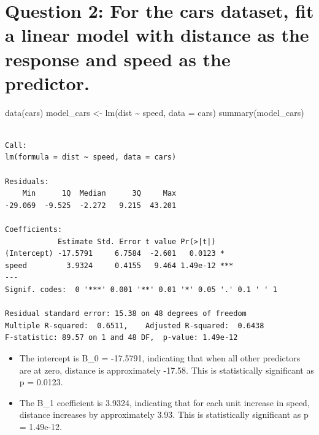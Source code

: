 \documentclass[
  letterpaper,
  DIV=11,
  numbers=noendperiod]{scrartcl}
\newenvironment{Shaded}{\begin{snugshade}}{\end{snugshade}}
\newcommand{\AttributeTok}[1]{\textcolor[rgb]{0.40,0.45,0.13}{#1}}
\newcommand{\FunctionTok}[1]{\textcolor[rgb]{0.28,0.35,0.67}{#1}}
\newcommand{\NormalTok}[1]{\textcolor[rgb]{0.00,0.23,0.31}{#1}}
\newcommand{\OtherTok}[1]{\textcolor[rgb]{0.00,0.23,0.31}{#1}}
\newcommand{\SpecialCharTok}[1]{\textcolor[rgb]{0.37,0.37,0.37}{#1}}
\begin{document}
\hypertarget{question-2-for-the-cars-dataset-fit-a-linear-model-with-distance-as-the-response-and-speed-as-the-predictor.}{%
\section{Question 2: For the cars dataset, fit a linear model with
distance as the response and speed as the
predictor.}\label{question-2-for-the-cars-dataset-fit-a-linear-model-with-distance-as-the-response-and-speed-as-the-predictor.}}

\begin{Shaded}
\begin{Highlighting}[]
\FunctionTok{data}\NormalTok{(cars)}
\NormalTok{model\_cars }\OtherTok{\textless{}{-}} \FunctionTok{lm}\NormalTok{(dist }\SpecialCharTok{\textasciitilde{}}\NormalTok{ speed, }\AttributeTok{data =}\NormalTok{ cars)}
\FunctionTok{summary}\NormalTok{(model\_cars)}
\end{Highlighting}
\end{Shaded}

\begin{verbatim}

Call:
lm(formula = dist ~ speed, data = cars)

Residuals:
    Min      1Q  Median      3Q     Max 
-29.069  -9.525  -2.272   9.215  43.201 

Coefficients:
            Estimate Std. Error t value Pr(>|t|)    
(Intercept) -17.5791     6.7584  -2.601   0.0123 *  
speed         3.9324     0.4155   9.464 1.49e-12 ***
---
Signif. codes:  0 '***' 0.001 '**' 0.01 '*' 0.05 '.' 0.1 ' ' 1

Residual standard error: 15.38 on 48 degrees of freedom
Multiple R-squared:  0.6511,    Adjusted R-squared:  0.6438 
F-statistic: 89.57 on 1 and 48 DF,  p-value: 1.49e-12
\end{verbatim}

\begin{itemize}
\item
  The intercept is B\_0 = -17.5791, indicating that when all other
  predictors are at zero, distance is approximately -17.58. This is
  statistically significant as p = 0.0123.
\item
  The B\_1 coefficient is 3.9324, indicating that for each unit increase
  in speed, distance increases by approximately 3.93. This is
  statistically significant as p = 1.49e-12.
\end{itemize}
\end{document}
